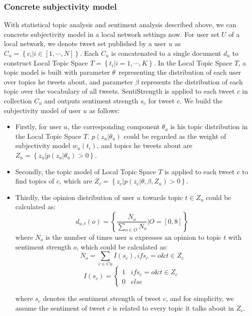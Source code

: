 \documentclass[smallcondensed]{svjour3}     %
\begin{document}
\subsubsection{Concrete subjectivity model }
\label{concrete}
With statistical topic analysis and sentiment analysis described above, we can concrete subjectivity model  in a local network settings now. 
For user set $ U $ of a local network, we denote tweet set published by a user $ u $ as $ C_{u}=\left\lbrace c_{i} \vert i \in \left[ 1, \cdots, N \right]  \right\rbrace$. Each $ C_{u} $ is concatenated to a single document $ d_{u} $ to construct Local Topic Space $ T=\left\lbrace t_{i} \vert i=1, \cdots, K \right\rbrace $.
In the Local Topic Space $ T $, a topic model is built with parameter $ \theta $\ representing the distribution of each user over topics he tweets about, and
parameter $ \beta $ represents the distribution of each topic over the vocabulary of all tweets. SentiStrength is applied to each tweet $ c $ in collection $ C_{u} $ and outputs sentiment strength $ s_{c} $ for tweet $ c $. 
We build the subjectivity model  of user $ u $ as follows:
\begin{itemize}
\item Firstly, for user $ u $, the corresponding component $ \theta_{u} $ is his topic distribution in the Local Topic Space $ T $. $ p\left( z_{u} \vert \theta_{u} \right)  $ could be regarded as the weight of subjectivity model  $ w_{u} \left( t_{i} \right)  $, and topics he tweets about are $ Z_{u}= \left\lbrace z_{u} \vert p\left( z_{u} \vert \theta_{u} \right)>0 \right\rbrace $.
\item Secondly, the topic model of Local Topic Space $ T $ is applied to each tweet $ c $ to find topics of $ c $, which are $ Z_{c} =\left\lbrace z_{c} \vert p\left( z_{c} \vert \theta, \beta, Z_{u} \right)>0 \right\rbrace $.
\item Thirdly, the opinion distribution of user $ u $ towards topic $ t \in Z_{u} $ could be calculated as:
\begin{equation}
\label{opinionall}
d_{u,t} \left( o \right) = \left\{ \frac{N_{o}}{\sum_{o \in O} N_{o}} | O=\left[ 0,  8 \right] \right\}
\end{equation}
%   
where $ N_{o} $ is the number of times user $ u $ expresses an opinion to topic $ t $ with sentiment strength $ o $, which could be calculated as:
\begin{equation}
\label{opinion1}
N_{o}=\sum_{c \in Cu} I\left( s_{c} \right) ,  if  s_{c}=o \& t \in Z_{c}
\end{equation}
\begin{equation}
\label{opinion2}
I\left( s_{c} \right)=\left\{
\begin{array}{ll}
{1} &  if  s_{c}=o \& t \in Z_{c}\\
{0} &  else
\end{array}
\right.
\end{equation}

where $ s_{c} $ denotes the sentiment strength of tweet $ c $, and for simplicity, we assume the sentiment of tweet $ c $ is related to every topic it talks about in $ Z_{c} $.

\end{itemize}
\end{document}

